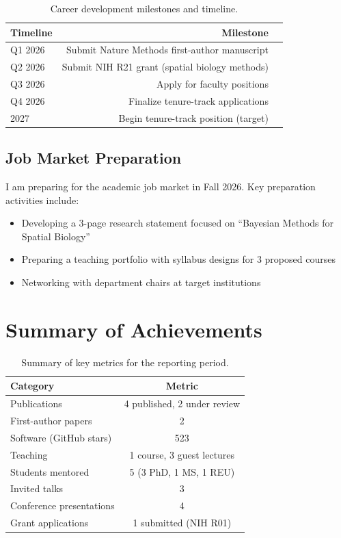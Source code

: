 \documentclass[
    language=english,
    doctype=postdoc-report,
    institution=none,
]{../../omnilatex}
\begin{document}
\begin{table}[htbp]
    \centering
    \caption{Career development milestones and timeline.}
    \label{tab:career}
    \begin{tabular}{@{}ld{12}l@{}}
        \toprule
        Timeline & Milestone \\
        \midrule
        Q1 2026 & Submit Nature Methods first-author manuscript \\
        Q2 2026 & Submit NIH R21 grant (spatial biology methods) \\
        Q3 2026 & Apply for faculty positions \\
        Q4 2026 & Finalize tenure-track applications \\
        2027    & Begin tenure-track position (target) \\
        \bottomrule
    \end{tabular}
\end{table}

\subsection{Job Market Preparation}

I am preparing for the academic job market in Fall 2026. Key preparation
activities include:

\begin{itemize}
    \item Developing a 3-page research statement focused on ``Bayesian
          Methods for Spatial Biology''
    \item Preparing a teaching portfolio with syllabus designs for 3
          proposed courses
    \item Networking with department chairs at target institutions
\end{itemize}

\section{Summary of Achievements}
\label{sec:summary}

\begin{table}[htbp]
    \centering
    \caption{Summary of key metrics for the reporting period.}
    \label{tab:summary}
    \begin{tabular}{@{}lc@{}}
        \toprule
        Category & Metric \\
        \midrule
        Publications & 4 published, 2 under review \\
        First-author papers & 2 \\
        Software (GitHub stars) & 523 \\
        Teaching & 1 course, 3 guest lectures \\
        Students mentored & 5 (3 PhD, 1 MS, 1 REU) \\
        Invited talks & 3 \\
        Conference presentations & 4 \\
        Grant applications & 1 submitted (NIH R01) \\
        \bottomrule
    \end{tabular}
\end{table}
\end{document}
